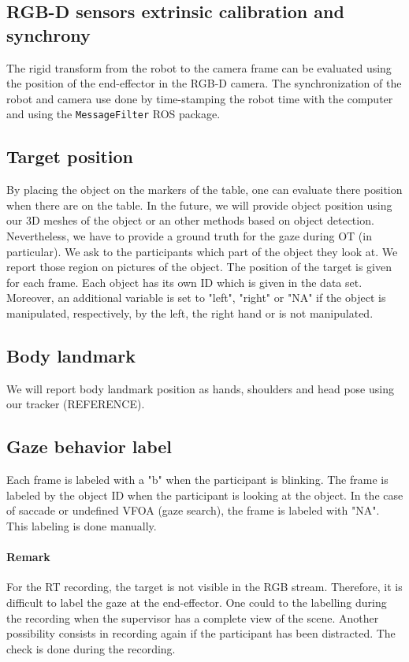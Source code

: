 \documentclass[11pt,a4paper]{article}
\begin{document}
\subsection{RGB-D sensors extrinsic calibration and synchrony}
The rigid transform from the robot to the camera frame can be evaluated using the position of the end-effector in the RGB-D camera. The synchronization of the robot and camera use done by time-stamping the robot time with the computer and using the \texttt{MessageFilter} ROS package.

\subsection{Target position}
By placing the object on the markers of the table, one can evaluate there position when there are on the table. In the future, we will provide object position using our 3D meshes of the object or an other methods based on object detection. Nevertheless, we have to provide a ground truth for the gaze during OT (in particular). We ask to the participants which part of the object they look at. We report those region on pictures of the object. The position of the target is given for each frame. Each object has its own ID which is given in the data set. Moreover, an additional variable is set to "left", "right" or "NA" if the object is manipulated, respectively, by the left, the right hand or is not manipulated.

\subsection{Body landmark}
We will report body landmark position as hands, shoulders and head pose using our tracker (REFERENCE).

\subsection{Gaze behavior label}
Each frame is labeled with a "b" when the participant is blinking. The frame is labeled by the object ID when the participant is looking at the object. In the case of saccade or undefined VFOA (gaze search), the frame is labeled with "NA". This labeling is done manually. 
\paragraph{Remark}
For the RT recording, the target is not visible in the RGB stream. Therefore, it is difficult to label the gaze at the end-effector. One could to the labelling during the recording when the supervisor has a complete view of the scene. Another possibility consists in recording again if the participant has been distracted. The check is done during the recording.
\end{document}
